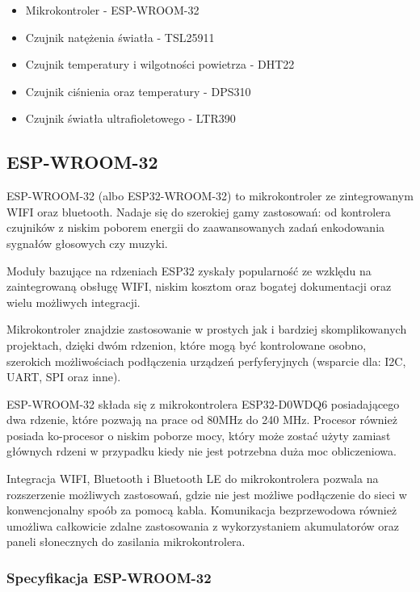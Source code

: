 \documentclass[12pt,a4paper]{article}
\begin{document}
\begin{itemize}
    \item Mikrokontroler - ESP-WROOM-32
    \item Czujnik natężenia światła - TSL25911
    \item Czujnik temperatury i wilgotności powietrza - DHT22
    \item Czujnik ciśnienia oraz temperatury - DPS310
    \item Czujnik światła ultrafioletowego - LTR390
\end{itemize}

\subsection{ESP-WROOM-32}
ESP-WROOM-32 (albo ESP32-WROOM-32) to mikrokontroler ze zintegrowanym WIFI oraz bluetooth. Nadaje się do szerokiej gamy zastosowań:
od kontrolera czujników z niskim poborem energii do zaawansowanych zadań enkodowania sygnałów głosowych czy muzyki.

Moduły bazujące na rdzeniach ESP32 zyskały popularność ze wzklędu na zaintegrowaną obsługę WIFI, 
niskim kosztom oraz bogatej dokumentacji oraz wielu możliwych integracji.

Mikrokontroler znajdzie zastosowanie w prostych jak i bardziej skomplikowanych projektach, dzięki dwóm rdzenion, które mogą być kontrolowane osobno,
szerokich możliwościach podłączenia urządzeń perfyferyjnych (wsparcie dla: I2C, UART, SPI oraz inne).

ESP-WROOM-32 składa się z mikrokontrolera ESP32-D0WDQ6 posiadającego dwa rdzenie, które pozwają na prace od 80MHz do 240 MHz. Procesor również
posiada ko-procesor o niskim poborze mocy, który może zostać użyty zamiast głównych rdzeni w przypadku kiedy nie jest potrzebna duża moc obliczeniowa.

Integracja WIFI, Bluetooth i Bluetooth LE do mikrokontrolera pozwala na rozszerzenie możliwych zastosowań, gdzie nie jest możliwe podłączenie do sieci
w konwencjonalny spoób za pomocą kabla. Komunikacja bezprzewodowa również umożliwa całkowicie zdalne zastosowania z wykorzystaniem akumulatorów
oraz paneli słonecznych do zasilania mikrokontrolera.

\subsubsection{Specyfikacja ESP-WROOM-32}
\end{document}
